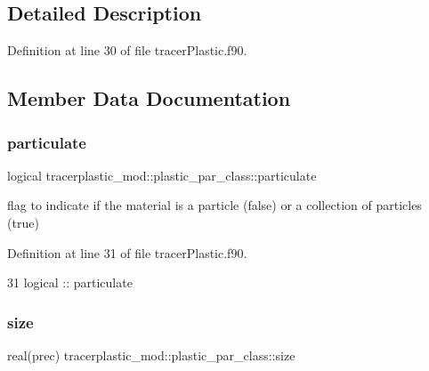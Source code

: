 \subsection{Detailed Description}


Definition at line 30 of file tracer\+Plastic.\+f90.



\subsection{Member Data Documentation}
\mbox{\label{structtracerplastic__mod_1_1plastic__par__class_a013591d7351786219189b294fae263b9}} 
\subsubsection{\texorpdfstring{particulate}{particulate}}
{\footnotesize\ttfamily logical tracerplastic\+\_\+mod\+::plastic\+\_\+par\+\_\+class\+::particulate\hspace{0.3cm}{\ttfamily [private]}}



flag to indicate if the material is a particle (false) or a collection of particles (true) 



Definition at line 31 of file tracer\+Plastic.\+f90.


\begin{DoxyCode}
31         \textcolor{keywordtype}{logical}    :: particulate
\end{DoxyCode}
\mbox{\label{structtracerplastic__mod_1_1plastic__par__class_a0dd25951e4670cedda088f8a6833ad1b}} 
\subsubsection{\texorpdfstring{size}{size}}
{\footnotesize\ttfamily real(prec) tracerplastic\+\_\+mod\+::plastic\+\_\+par\+\_\+class\+::size\hspace{0.3cm}{\ttfamily [private]}}



